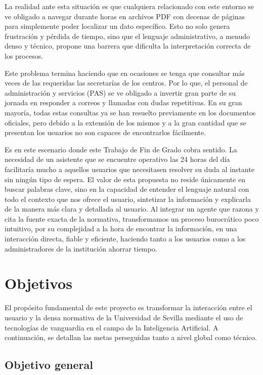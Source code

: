 \documentclass[12pt,a4paper,oneside]{report}
\begin{document}
La realidad ante esta situación es que cualquiera relacionado con este entorno se ve obligado a navegar durante horas en archivos PDF con decenas de páginas para simplemente poder localizar un dato específico. Esto no solo genera frustración y pérdida de tiempo, sino que el lenguaje administrativo, a menudo denso y técnico, propone una barrera que dificulta la interpretación correcta de los procesos.

Este problema termina haciendo que en ocasiones se tenga que consultar más veces de las requeridas las secretarías de los centros. Por lo que, el personal de administración y servicios (PAS) se ve obligado a invertir gran parte de su jornada en responder a correos y llamadas con dudas repetitivas. En su gran mayoría, todas estas consultas ya se han resuelto previamente en los documentos oficiales, pero debido a la extensión de los mismos y a la gran cantidad que se presentan los usuarios no son capaces de encontrarlos fácilmente.

Es en este escenario donde este Trabajo de Fin de Grado cobra sentido. La necesidad de un asistente que se encuentre operativo las 24 horas del día facilitaría mucho a aquellos usuarios que necesitasen resolver su duda al instante sin ningún tipo de espera. El valor de esta propuesta no reside únicamente en buscar palabras clave, sino en la capacidad de entender el lenguaje natural con todo el contexto que nos ofrece el usuario, sintetizar la información y explicarla de la manera más clara y detallada al usuario. Al integrar un agente que razona y cita la fuente exacta de la normativa, transformamos un proceso burocrático poco intuitivo, por su complejidad a la hora de encontrar la información, en una interacción directa, fiable y eficiente, haciendo tanto a los usuarios como a los administradores de la institución ahorrar tiempo.

\section{Objetivos}

El propósito fundamental de este proyecto es transformar la interacción entre el usuario y la densa normativa de la Universidad de Sevilla mediante el uso de tecnologías de vanguardia en el campo de la Inteligencia Artificial. A continuación, se detallan las metas perseguidas tanto a nivel global como técnico.

\subsection{Objetivo general}
\end{document}
